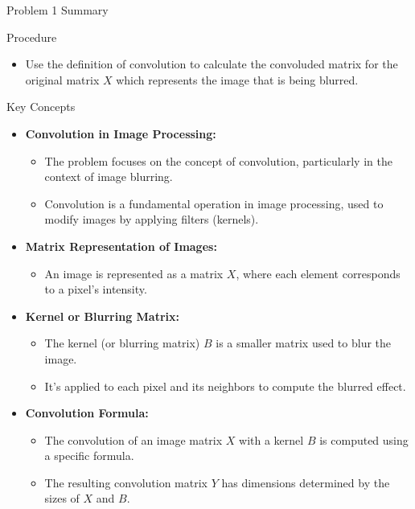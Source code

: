\begin{summary}{Problem 1 Summary}
    \begin{statement}{Procedure}
        \begin{itemize}
            \item Use the definition of convolution to calculate the convoluded matrix for the original matrix $X$ which represents the image that is being blurred.
        \end{itemize}
    \end{statement}
    \begin{statement}{Key Concepts}
        \begin{itemize}
            \item \textbf{Convolution in Image Processing:}
            \begin{itemize}
                \item The problem focuses on the concept of convolution, particularly in the context of image blurring.
                \item Convolution is a fundamental operation in image processing, used to modify images by applying filters (kernels).
            \end{itemize}
            \item \textbf{Matrix Representation of Images:}
            \begin{itemize}
                \item An image is represented as a matrix $X$, where each element corresponds to a pixel's intensity.
            \end{itemize}
            \item \textbf{Kernel or Blurring Matrix:}
            \begin{itemize}
                \item The kernel (or blurring matrix) $B$ is a smaller matrix used to blur the image.
                \item It's applied to each pixel and its neighbors to compute the blurred effect.
            \end{itemize}
            \item \textbf{Convolution Formula:}
            \begin{itemize}
                \item The convolution of an image matrix $X$ with a kernel $B$ is computed using a specific formula.
                \item The resulting convolution matrix $Y$ has dimensions determined by the sizes of $X$ and $B$.

\end{itemize}
\end{itemize}
\end{statement}
\end{summary}
